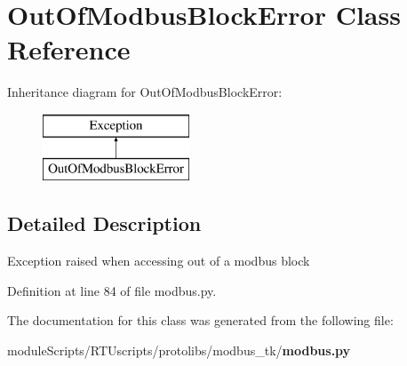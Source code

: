 \section{Out\+Of\+Modbus\+Block\+Error Class Reference}
\label{classprotolibs_1_1modbus__tk_1_1modbus_1_1_out_of_modbus_block_error}
Inheritance diagram for Out\+Of\+Modbus\+Block\+Error\+:\begin{figure}[H]
\begin{center}
\leavevmode
\includegraphics[height=2.000000cm]{classprotolibs_1_1modbus__tk_1_1modbus_1_1_out_of_modbus_block_error}
\end{center}
\end{figure}


\subsection{Detailed Description}
\begin{DoxyVerb}Exception raised when accessing out of a modbus block\end{DoxyVerb}
 

Definition at line 84 of file modbus.\+py.



The documentation for this class was generated from the following file\+:\begin{DoxyCompactItemize}
\item 
module\+Scripts/\+R\+T\+Uscripts/protolibs/modbus\+\_\+tk/{\bf modbus.\+py}\end{DoxyCompactItemize}
